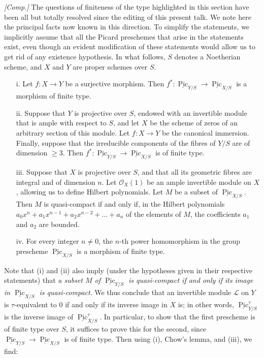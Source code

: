 \begin{remark}\label{ffga3.vi-4-remark-comp}
    \emph{[Comp.]}
    The questions of finiteness of the type highlighted in this section have been all but totally resolved since the editing of this present talk.
    We note here the principal facts now known in this direction.
    To simplify the statements, we implicitly assume that all the Picard preschemes that arise in the statements exist, even though an evident modification of these statements would allow us to get rid of any existence hypothesis.
    In what follows, $S$ denotes a Noetherian scheme, and $X$ and $Y$ are proper schemes over $S$.

    \begin{enumerate}
        \item[i.] Let $f\colon X\to Y$ be a surjective morphism.
              Then $f^*\colon\underline{\operatorname{Pic}}_{Y/S}\to\underline{\operatorname{Pic}}_{X/S}$ is a morphism of finite type.
        \item[ii.] Suppose that $Y$ is projective over $S$, endowed with an invertible module that is ample with respect to $S$, and let $X$ be the scheme of zeros of an arbitrary section of this module.
              Let $f\colon X\to Y$ be the canonical immersion.
              Finally, suppose that the irreducible components of the fibres of $Y/S$ are of dimension $\geqslant3$.
              Then $f^*\colon\underline{\operatorname{Pic}}_{Y/S}\to\underline{\operatorname{Pic}}_{X/S}$ is of finite type.
        \item [iii.] Suppose that $X$ is projective over $S$, and that all its geometric fibres are integral and of dimension $n$.
              Let $\mathcal{O}_X(1)$ be an ample invertible module on $X$, allowing us to define Hilbert polynomials.
              Let $M$ be a subset of $\underline{\operatorname{Pic}}_{X/S}$.
              Then $M$ is quasi-compact if and only if, in the Hilbert polynomials $a_0x^n+a_1x^{n-1}+a_2x^{n-2}+\ldots+a_n$ of the elements of $M$, the coefficients $a_1$ and $a_2$ are bounded.
        \item [iv.] For every integer $n\neq0$, the $n$-th power homomorphism in the group prescheme $\underline{\operatorname{Pic}}_{X/S}$ is a morphism of finite type.
    \end{enumerate}

    Note that (i) and (ii) also imply (under the hypotheses given in their respective statements) that \emph{a subset $M$ of $\underline{\operatorname{Pic}}_{Y/S}$ is quasi-compact if and only if its image in $\underline{\operatorname{Pic}}_{X/S}$ is quasi-compact}.
    We thus conclude that an invertible module $\mathcal{L}$ on $Y$ is $\tau$-equivalent to $0$ if and only if its inverse image in $X$ is;
    in other words, $\underline{\operatorname{Pic}}_{Y/S}^\tau$ is the inverse image of $\underline{\operatorname{Pic}}_{X/S}^\tau$.
    In particular, to show that the first prescheme is of finite type over $S$, it suffices to prove this for the second, since $\underline{\operatorname{Pic}}_{Y/S}\to\underline{\operatorname{Pic}}_{X/S}$ is of finite type.
    Then using (i), Chow's lemma, and (iii), we find:


\end{remark}
